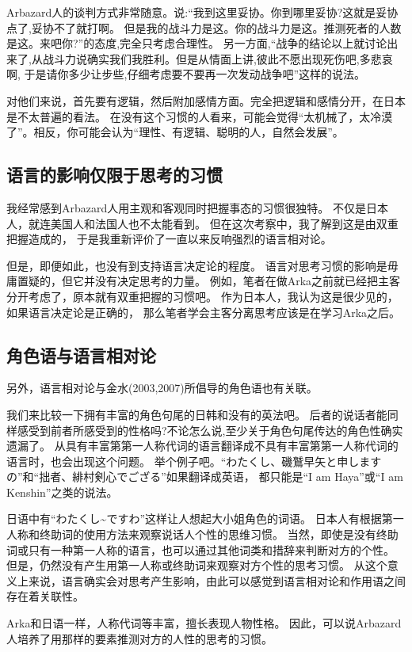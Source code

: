 Arbazard人的谈判方式非常随意。说:“我到这里妥协。你到哪里妥协?这就是妥协点了,妥协不了就打啊。
但是我的战斗力是这。你的战斗力是这。推测死者的人数是这。来吧你?”的态度,完全只考虑合理性。
另一方面,“战争的结论以上就讨论出来了,从战斗力说确实我们我胜利。但是从情面上讲,彼此不愿出现死伤吧,多悲哀啊,
于是请你多少让步些,仔细考虑要不要再一次发动战争吧”这样的说法。

对他们来说，首先要有逻辑，然后附加感情方面。完全把逻辑和感情分开，在日本是不太普遍的看法。
在没有这个习惯的人看来，可能会觉得“太机械了，太冷漠了”。相反，你可能会认为“理性、有逻辑、聪明的人，自然会发展”。
\subsection{语言的影响仅限于思考的习惯}
我经常感到Arbazard人用主观和客观同时把握事态的习惯很独特。
不仅是日本人，就连美国人和法国人也不太能看到。
但在这次考察中，我了解到这是由双重把握造成的，
于是我重新评价了一直以来反响强烈的语言相对论。

但是，即便如此，也没有到支持语言决定论的程度。
语言对思考习惯的影响是毋庸置疑的，但它并没有决定思考的力量。
例如，笔者在做Arka之前就已经把主客分开考虑了，原本就有双重把握的习惯吧。
作为日本人，我认为这是很少见的，如果语言决定论是正确的，
那么笔者学会主客分离思考应该是在学习Arka之后。

\subsection{角色语与语言相对论}
另外，语言相对论与金水(2003,2007)所倡导的角色语也有关联。

我们来比较一下拥有丰富的角色句尾的日韩和没有的英法吧。
后者的说话者能同样感受到前者所感受到的性格吗?不论怎么说,至少关于角色句尾传达的角色性确实遗漏了。
从具有丰富第第一人称代词的语言翻译成不具有丰富第第一人称代词的语言时，也会出现这个问题。
举个例子吧。“わたくし、磯鷲早矢と申しますの”和“拙者、緋村剣心でござる”如果翻译成英语，
都只能是“I am Haya”或“I am Kenshin”之类的说法。

日语中有“わたくし\~{}ですわ”这样让人想起大小姐角色的词语。
日本人有根据第一人称和终助词的使用方法来观察说话人个性的思维习惯。
当然，即使是没有终助词或只有一种第一人称的语言，也可以通过其他词类和措辞来判断对方的个性。
但是，仍然没有产生用第一人称或终助词来观察对方个性的思考习惯。
从这个意义上来说，语言确实会对思考产生影响，由此可以感觉到语言相对论和作用语之间存在着关联性。

Arka和日语一样，人称代词等丰富，擅长表现人物性格。
因此，可以说Arbazard人培养了用那样的要素推测对方的人性的思考的习惯。
